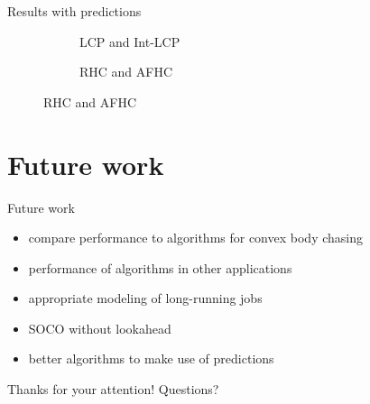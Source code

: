 \documentclass{beamer}
\begin{document}
\begin{frame}{Results with predictions}
\begin{figure}
    \begin{subfigure}[b]{.51\linewidth}
    \resizebox{\textwidth}{!}{}
    \caption{LCP and Int-LCP}
    \end{subfigure}\pause
    \begin{subfigure}[b]{.48\linewidth}
    \resizebox{\textwidth}{!}{}
    \caption{RHC and AFHC}
    \end{subfigure}
\end{figure}
\end{frame}

\section{Future work}

\begin{frame}{Future work}
\begin{itemize}
    \item compare performance to algorithms for convex body chasing\pause
    \item performance of algorithms in other applications\pause
    \item appropriate modeling of long-running jobs\pause
    \item SOCO without lookahead\pause
    \item better algorithms to make use of predictions
\end{itemize}
\end{frame}

\begin{frame}
\centering \large
Thanks for your attention!
Questions?
\end{frame}

\end{document}
